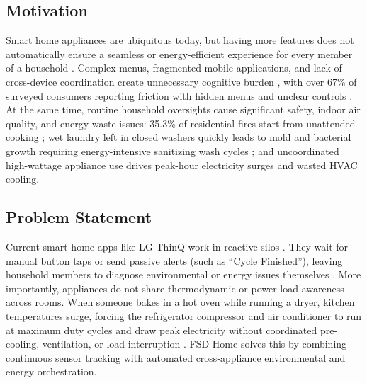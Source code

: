 \documentclass[conference]{IEEEtran}
\begin{document}
\subsection{Motivation}
Smart home appliances are ubiquitous today, but having more features does not automatically ensure a seamless or energy-efficient experience for every member of a household \cite{msit2026}. Complex menus, fragmented mobile applications, and lack of cross-device coordination create unnecessary cognitive burden \cite{moneytoday2026}, with over 67\% of surveyed consumers reporting friction with hidden menus and unclear controls \cite{maeil2026}. At the same time, routine household oversights cause significant safety, indoor air quality, and energy-waste issues: 35.3\% of residential fires start from unattended cooking \cite{seoulfire2020, nfa2025}; wet laundry left in closed washers quickly leads to mold and bacterial growth requiring energy-intensive sanitizing wash cycles \cite{epa2022, who2009}; and uncoordinated high-wattage appliance use drives peak-hour electricity surges and wasted HVAC cooling.

\subsection{Problem Statement}
Current smart home apps like LG ThinQ work in reactive silos \cite{lgspec2026}. They wait for manual button taps or send passive alerts (such as ``Cycle Finished''), leaving household members to diagnose environmental or energy issues themselves \cite{pradhan2020}. More importantly, appliances do not share thermodynamic or power-load awareness across rooms. When someone bakes in a hot oven while running a dryer, kitchen temperatures surge, forcing the refrigerator compressor and air conditioner to run at maximum duty cycles and draw peak electricity without coordinated pre-cooling, ventilation, or load interruption \cite{ashrae2023}. FSD-Home solves this by combining continuous sensor tracking with automated cross-appliance environmental and energy orchestration.
\end{document}
